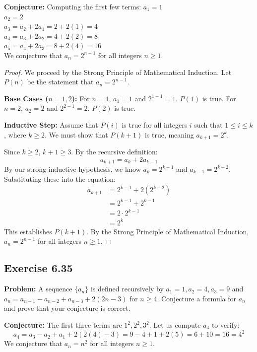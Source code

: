 \documentclass[11pt, a4paper]{article}
\theoremstyle{definition}
\theoremstyle{remark}
\begin{document}
\textbf{Conjecture:}
Computing the first few terms:
$a_1 = 1$ \\
$a_2 = 2$ \\
$a_3 = a_2 + 2a_1 = 2 + 2(1) = 4$ \\
$a_4 = a_3 + 2a_2 = 4 + 2(2) = 8$ \\
$a_5 = a_4 + 2a_3 = 8 + 2(4) = 16$ \\
We conjecture that $a_n = 2^{n-1}$ for all integers $n \ge 1$.

\begin{proof}
    We proceed by the Strong Principle of Mathematical Induction. Let $P(n)$ be the statement that $a_n = 2^{n-1}$.
    
    \textbf{Base Cases ($n=1, 2$):}
    For $n=1$, $a_1 = 1$ and $2^{1-1} = 1$. $P(1)$ is true.
    For $n=2$, $a_2 = 2$ and $2^{2-1} = 2$. $P(2)$ is true.
    
    \textbf{Inductive Step:}
    Assume that $P(i)$ is true for all integers $i$ such that $1 \le i \le k$, where $k \ge 2$. We must show that $P(k+1)$ is true, meaning $a_{k+1} = 2^k$.
    
    Since $k \ge 2$, $k+1 \ge 3$. By the recursive definition:
    \[ a_{k+1} = a_k + 2a_{k-1} \]
    By our strong inductive hypothesis, we know $a_k = 2^{k-1}$ and $a_{k-1} = 2^{k-2}$. Substituting these into the equation:
    \begin{align*}
        a_{k+1} &= 2^{k-1} + 2(2^{k-2}) \\
        &= 2^{k-1} + 2^{k-1} \\
        &= 2 \cdot 2^{k-1} \\
        &= 2^k
    \end{align*}
    This establishes $P(k+1)$. By the Strong Principle of Mathematical Induction, $a_n = 2^{n-1}$ for all integers $n \ge 1$.
\end{proof}

\subsection{Exercise 6.35}
\textbf{Problem:} A sequence $\{a_n\}$ is defined recursively by $a_1 = 1, a_2 = 4, a_3 = 9$ and $a_n = a_{n-1} - a_{n-2} + a_{n-3} + 2(2n-3)$ for $n \ge 4$. Conjecture a formula for $a_n$ and prove that your conjecture is correct.

\textbf{Conjecture:}
The first three terms are $1^2, 2^2, 3^2$. Let us compute $a_4$ to verify:
\[ a_4 = a_3 - a_2 + a_1 + 2(2(4)-3) = 9 - 4 + 1 + 2(5) = 6 + 10 = 16 = 4^2 \]
We conjecture that $a_n = n^2$ for all integers $n \ge 1$.
\end{document}
